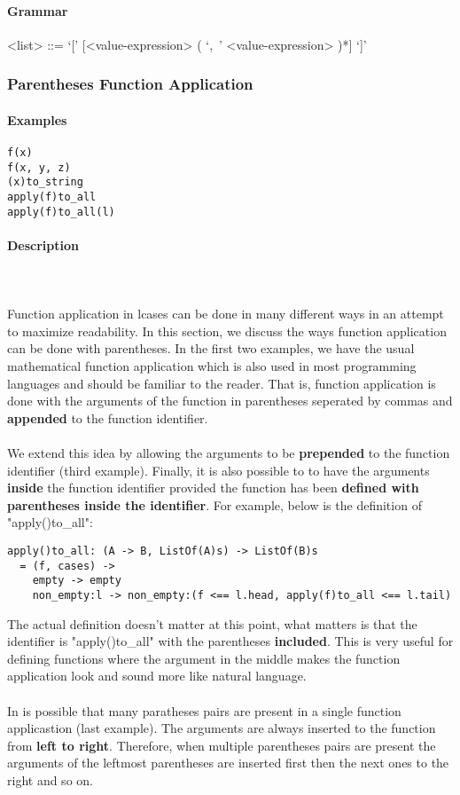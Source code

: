 \documentclass{article}
\def\pend{\mbox{} \\\\}
\begin{document}
\paragraph{Grammar}
\begin{grammar}
<list> ::= `[' [<value-expression> ( `,\ ' <value-expression> )*] `]'
\end{grammar}

\subsubsection{Parentheses Function Application}

\paragraph{Examples}

\begin{verbatim}
f(x)
f(x, y, z)
(x)to_string
apply(f)to_all
apply(f)to_all(l)
\end{verbatim}

\paragraph{Description}\pend
Function application in lcases can be done in many different ways in an attempt to 
maximize readability. In this section, we discuss the ways function application can
be done with parentheses. In the first two examples, we have the usual mathematical
function application which is also used in most programming languages and
should be familiar to the reader. That is, function application is done with the 
arguments of the function in parentheses seperated by commas and \textbf{appended}
to the function identifier.
\\\\
We extend this idea by allowing the arguments to be \textbf{prepended} to the
function identifier (third example). Finally, it is also possible to to have
the arguments \textbf{inside} the function identifier provided the function has
been \textbf{defined with parentheses inside the identifier}. For example,
below is the definition of "apply()to\_all":

\begin{verbatim}
apply()to_all: (A -> B, ListOf(A)s) -> ListOf(B)s
  = (f, cases) ->
    empty -> empty
    non_empty:l -> non_empty:(f <== l.head, apply(f)to_all <== l.tail)
\end{verbatim}
The actual definition doesn't matter at this point, what matters is that the 
identifier is "apply()to\_all" with the parentheses \textbf{included}. This is very
useful for defining functions where the argument in the middle makes the function
application look and sound more like natural language.
\\\\
In is possible that many paratheses pairs are present in a single function
applicastion (last example). The arguments are always inserted to the function
from \textbf{left to right}.  Therefore, when multiple parentheses pairs are
present the arguments of the leftmost parentheses are inserted first then the
next ones to the right and so on.
\end{document}
